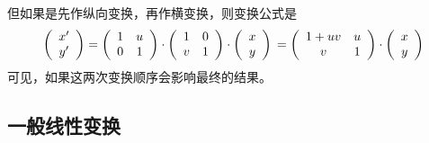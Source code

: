 但如果是先作纵向变换，再作横变换，则变换公式是
\begin{equation*}
  \left(
    \begin{array}{c}
      x' \\
      y'
    \end{array}
  \right)
    = 
    \left(
      \begin{array}{cc}
        1 & u \\
        0 & 1
      \end{array}
    \right)
\cdot
    \left(
      \begin{array}{cc}
        1 & 0 \\
        v & 1
      \end{array}
    \right)
 \cdot
  \left(
    \begin{array}{c}
      x \\
      y
    \end{array}
  \right)
  \\
   = 
     \left(
      \begin{array}{cc}
        1+uv & u \\
        v & 1
      \end{array}
    \right)
 \cdot
  \left(
    \begin{array}{c}
      x \\
      y
    \end{array}
  \right)
\end{equation*}
可见，如果这两次变换顺序会影响最终的结果。


\subsection{一般线性变换}
\label{sec:two-dimension-linear-translation}

